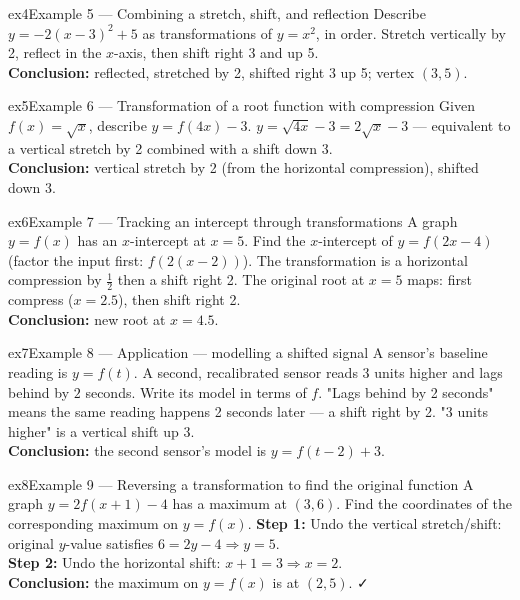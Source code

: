 \documentclass[11pt]{article}
\begin{document}
\begin{example}{ex4}{Example 5 --- Combining a stretch, shift, and reflection}
Describe $y=-2(x-3)^2+5$ as transformations of $y=x^2$, in order.\soln
Stretch vertically by 2, reflect in the $x$-axis, then shift right 3 and up 5.\\[3pt]\textbf{Conclusion:} reflected, stretched by 2, shifted right 3 up 5; vertex $(3,5)$.
\end{example}

\begin{example}{ex5}{Example 6 --- Transformation of a root function with compression}
Given $f(x)=\sqrt x$, describe $y=f(4x)-3$.\soln
$y=\sqrt{4x}-3=2\sqrt x-3$ --- equivalent to a vertical stretch by 2 combined with a shift down 3.\\[3pt]\textbf{Conclusion:} vertical stretch by 2 (from the horizontal compression), shifted down 3.
\end{example}

\begin{example}{ex6}{Example 7 --- Tracking an intercept through transformations}
A graph $y=f(x)$ has an $x$-intercept at $x=5$. Find the $x$-intercept of $y=f(2x-4)$ (factor the input first: $f(2(x-2))$).\soln
The transformation is a horizontal compression by $\tfrac12$ then a shift right 2. The original root at $x=5$ maps: first compress ($x=2.5$), then shift right 2.\\[3pt]\textbf{Conclusion:} new root at $x=4.5$.
\end{example}

\begin{example}{ex7}{Example 8 --- Application --- modelling a shifted signal}
A sensor's baseline reading is $y=f(t)$. A second, recalibrated sensor reads $3$ units higher and lags behind by $2$ seconds. Write its model in terms of $f$.\soln
"Lags behind by 2 seconds" means the same reading happens 2 seconds later --- a shift right by 2. "3 units higher" is a vertical shift up 3.\\[3pt]\textbf{Conclusion:} the second sensor's model is $y=f(t-2)+3$.
\end{example}

\begin{example}{ex8}{Example 9 --- Reversing a transformation to find the original function}
A graph $y=2f(x+1)-4$ has a maximum at $(3,6)$. Find the coordinates of the corresponding maximum on $y=f(x)$.\soln
\textbf{Step 1:} Undo the vertical stretch/shift: original $y$-value satisfies $6=2y-4\Rightarrow y=5$.\\[3pt]
\textbf{Step 2:} Undo the horizontal shift: $x+1=3\Rightarrow x=2$.\\[3pt]\textbf{Conclusion:} the maximum on $y=f(x)$ is at $(2,5)$. ✓
\end{example}
\end{document}
